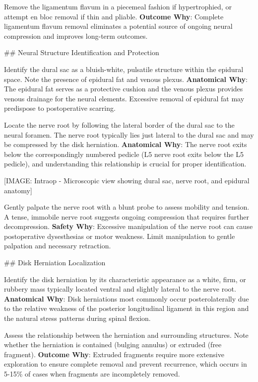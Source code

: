 \documentclass[12pt,a4paper]{article}
\begin{document}
Remove the ligamentum flavum in a piecemeal fashion if hypertrophied, or attempt en bloc removal if thin and pliable. \textbf{Outcome Why}: Complete ligamentum flavum removal eliminates a potential source of ongoing neural compression and improves long-term outcomes.

\#\# Neural Structure Identification and Protection

Identify the dural sac as a bluish-white, pulsatile structure within the epidural space. Note the presence of epidural fat and venous plexus. \textbf{Anatomical Why}: The epidural fat serves as a protective cushion and the venous plexus provides venous drainage for the neural elements. Excessive removal of epidural fat may predispose to postoperative scarring.

Locate the nerve root by following the lateral border of the dural sac to the neural foramen. The nerve root typically lies just lateral to the dural sac and may be compressed by the disk herniation. \textbf{Anatomical Why}: The nerve root exits below the correspondingly numbered pedicle (L5 nerve root exits below the L5 pedicle), and understanding this relationship is crucial for proper identification.

[IMAGE: Intraop - Microscopic view showing dural sac, nerve root, and epidural anatomy]

Gently palpate the nerve root with a blunt probe to assess mobility and tension. A tense, immobile nerve root suggests ongoing compression that requires further decompression. \textbf{Safety Why}: Excessive manipulation of the nerve root can cause postoperative dysesthesias or motor weakness. Limit manipulation to gentle palpation and necessary retraction.

\#\# Disk Herniation Localization

Identify the disk herniation by its characteristic appearance as a white, firm, or rubbery mass typically located ventral and slightly lateral to the nerve root. \textbf{Anatomical Why}: Disk herniations most commonly occur posterolaterally due to the relative weakness of the posterior longitudinal ligament in this region and the natural stress patterns during spinal flexion.

Assess the relationship between the herniation and surrounding structures. Note whether the herniation is contained (bulging annulus) or extruded (free fragment). \textbf{Outcome Why}: Extruded fragments require more extensive exploration to ensure complete removal and prevent recurrence, which occurs in 5-15\% of cases when fragments are incompletely removed.
\end{document}
